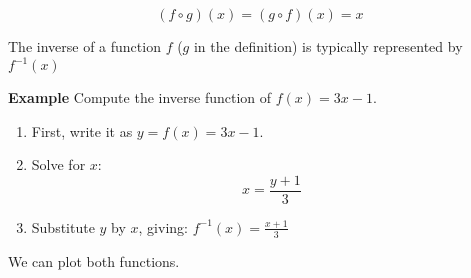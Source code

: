 \documentclass[11pt]{article}
\providecommand{\tightlist}{%
      \setlength{\itemsep}{0pt}\setlength{\parskip}{0pt}}
\begin{document}
\[
(f\circ g)(x) = (g \circ f)(x) = x
\]

The inverse of a function \(f\) (\(g\) in the definition) is typically
represented by \(f^{-1}(x)\)

\textbf{Example} Compute the inverse function of \(f(x) = 3x -1\).

\begin{enumerate}
\def\labelenumi{\arabic{enumi}.}
\tightlist
\item
  First, write it as \(y = f(x) = 3x - 1\).
\item
  Solve for \(x\): \[
  x = \frac{y+1}{3}
  \]
\item
  Substitute \(y\) by \(x\), giving: \(f^{-1}(x) = \frac{x+1}{3}\)
\end{enumerate}

We can plot both functions.
\end{document}

